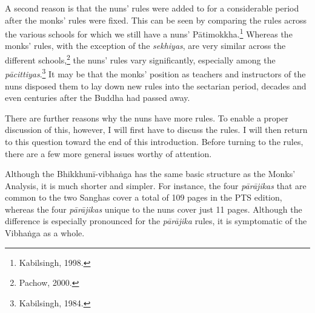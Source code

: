 \documentclass[12pt,openany]{book}%
\begin{document}
A second reason is that the nuns’ rules were added to for a considerable period after the monks’ rules were fixed. This can be seen by comparing the rules across the various schools for which we still have a nuns’ \textsanskrit{Pātimokkha}.\footnote{Kabilsingh, 1998. } Whereas the monks’ rules, with the exception of the \textit{sekhiyas}, are very similar across the different schools,\footnote{Pachow, 2000. } the nuns’ rules vary significantly, especially among the \textit{\textsanskrit{pācittiyas}}.\footnote{Kabilsingh, 1984. } It may be that the monks’ position as teachers and instructors of the nuns disposed them to lay down new rules into the sectarian period, decades and even centuries after the Buddha had passed away.

There are further reasons why the nuns have more rules. To enable a proper discussion of this, however, I will first have to discuss the rules. I will then return to this question toward the end of this introduction. Before turning to the rules, there are a few more general issues worthy of attention.

Although the \textsanskrit{Bhikkhunī}-\textsanskrit{vibhaṅga} has the same basic structure as the Monks’ Analysis, it is much shorter and simpler. For instance, the four \textit{\textsanskrit{pārājikas}} that are common to the two Sanghas cover a total of 109 pages in the PTS edition, whereas the four \textit{\textsanskrit{pārājikas}} unique to the nuns cover just 11 pages. Although the difference is especially pronounced for the \textit{\textsanskrit{pārājika}} rules, it is symptomatic of the \textsanskrit{Vibhaṅga} as a whole.
\end{document}

